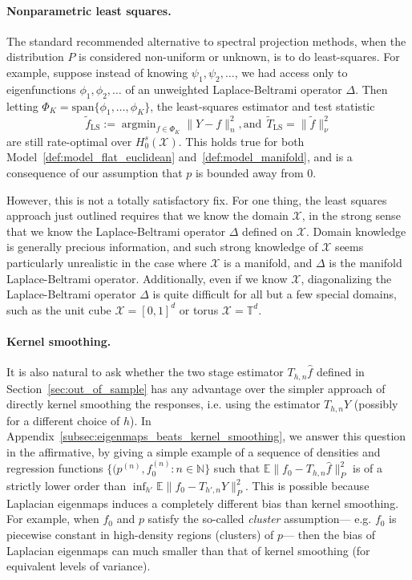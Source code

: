 \documentclass{article}
\newcommand{\1}{\mathbf{1}}
\DeclareMathOperator*{\argmin}{argmin}
\newcommand{\mc}[1]{\mathcal{#1}}
\newcommand{\Ebb}{\mathbb{E}}
\newcommand{\wt}[1]{\widetilde{#1}}
\newcommand{\wh}[1]{\widehat{#1}}
\theoremstyle{alden}
\theoremstyle{aldenthm}
\theoremstyle{definition}
\theoremstyle{remark}
\begin{document}
\paragraph{Nonparametric least squares.}
The standard recommended alternative to spectral projection methods, when the distribution $P$ is considered non-uniform or unknown, is to do least-squares. For example, suppose instead of knowing $\psi_1,\psi_2,\ldots$, we had access only to eigenfunctions $\phi_1,\phi_2,\ldots$ of an unweighted Laplace-Beltrami operator $\Delta$. Then letting $\Phi_K = \mathrm{span}\{\phi_1,\ldots,\phi_K\}$, the least-squares estimator and test statistic
\begin{equation*}
\wt{f}_{\mathrm{LS}} := \argmin_{f \in \Phi_K} \|Y - f\|_n^2,\textrm{and}~~\wt{T}_{\mathrm{LS}} = \|\wt{f}\|_{\nu}^2
\end{equation*}
are still rate-optimal over $H_0^s(\mc{X})$. This holds true for both Model~\ref{def:model_flat_euclidean} and~\ref{def:model_manifold}, and is a consequence of our assumption that $p$ is bounded away from $0$.

However, this is not a totally satisfactory fix. For one thing, the least squares approach just outlined requires that we know the domain $\mc{X}$, in the strong sense that we know the Laplace-Beltrami operator $\Delta$ defined on $\mc{X}$. Domain knowledge is generally precious information, and such strong knowledge of $\mc{X}$ seems particularly unrealistic in the case where $\mc{X}$ is a manifold, and $\Delta$ is the manifold Laplace-Beltrami operator. Additionally, even if we know $\mc{X}$, diagonalizing the Laplace-Beltrami operator $\Delta$ is quite difficult for all but a few special domains, such as the unit cube $\mc{X} = [0,1]^d$ or torus $\mc{X} = \mathbb{T}^d$.

\paragraph{Kernel smoothing.}
It is also natural to ask whether the two stage estimator $T_{h,n}\wh{f}$ defined in Section~\ref{sec:out_of_sample} has any advantage over the simpler approach of directly kernel smoothing the responses, i.e. using the estimator $T_{h,n}Y$ (possibly for a different choice of $h$). In Appendix~\ref{subsec:eigenmaps_beats_kernel_smoothing}, we answer this question in the affirmative, by giving a simple example of a sequence of densities and regression functions $\{(p^{(n)}, f_0^{(n)}: n \in \mathbb{N}\}$ such that $\Ebb\|f_0 - T_{h,n}\wh{f}\|_P^2$ is of a strictly lower order than $\inf_{h'} \Ebb\|f_0 - T_{h',n}Y\|_P^2$. This is possible because Laplacian eigenmaps induces a completely different bias than kernel smoothing. For example, when $f_0$ and $p$ satisfy the so-called \emph{cluster} assumption--- e.g. $f_0$ is piecewise constant in high-density regions (clusters) of $p$--- then the bias of Laplacian eigenmaps can much smaller than that of kernel smoothing (for equivalent levels of variance). 
\end{document}
